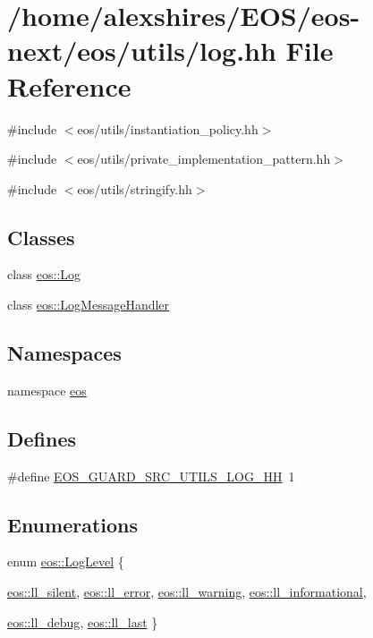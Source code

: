 \hypertarget{log_8hh}{
\section{/home/alexshires/EOS/eos-\/next/eos/utils/log.hh File Reference}
\label{log_8hh}
}
{\ttfamily \#include $<$eos/utils/instantiation\_\-policy.hh$>$}\par
{\ttfamily \#include $<$eos/utils/private\_\-implementation\_\-pattern.hh$>$}\par
{\ttfamily \#include $<$eos/utils/stringify.hh$>$}\par
\subsection*{Classes}
\begin{DoxyCompactItemize}
\item 
class \hyperlink{classeos_1_1Log}{eos::Log}
\item 
class \hyperlink{classeos_1_1LogMessageHandler}{eos::LogMessageHandler}
\end{DoxyCompactItemize}
\subsection*{Namespaces}
\begin{DoxyCompactItemize}
\item 
namespace \hyperlink{namespaceeos}{eos}
\end{DoxyCompactItemize}
\subsection*{Defines}
\begin{DoxyCompactItemize}
\item 
\#define \hyperlink{log_8hh_a911a0223120f9d69b5ba0a5782c3a7a2}{EOS\_\-GUARD\_\-SRC\_\-UTILS\_\-LOG\_\-HH}~1
\end{DoxyCompactItemize}
\subsection*{Enumerations}
\begin{DoxyCompactItemize}
\item 
enum \hyperlink{namespaceeos_ad6b42a08a08a1b63498f3f262bd15602}{eos::LogLevel} \{ \par
\hyperlink{namespaceeos_ad6b42a08a08a1b63498f3f262bd15602a9ba67f079c0a9154e568f0d207c5931b}{eos::ll\_\-silent}, 
\hyperlink{namespaceeos_ad6b42a08a08a1b63498f3f262bd15602ab160ece1c3e71b2fdf17ffd3b74b1d8f}{eos::ll\_\-error}, 
\hyperlink{namespaceeos_ad6b42a08a08a1b63498f3f262bd15602a5239af800d9d8cb9b83e52ee6b768941}{eos::ll\_\-warning}, 
\hyperlink{namespaceeos_ad6b42a08a08a1b63498f3f262bd15602a550a3ef110e24df3eb71bc7fcefe53f3}{eos::ll\_\-informational}, 
\par
\hyperlink{namespaceeos_ad6b42a08a08a1b63498f3f262bd15602ab4e8e8cf581d697726f51bc8afcb0499}{eos::ll\_\-debug}, 
\hyperlink{namespaceeos_ad6b42a08a08a1b63498f3f262bd15602a8fb5a1db33a7ac4dbe90a00ff09529de}{eos::ll\_\-last}
 \}
\end{DoxyCompactItemize}
